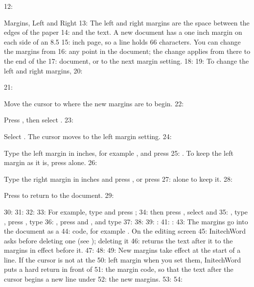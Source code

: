 12: \begin{Feature}{Margins, Left and Right}
13: The left and right margins are the space between the edges of the paper
14: and the text.  A new document has a one inch margin on each side of an 8.5
15: inch page, so a line holds 66 characters.  You can change the margins from
16: any point in the document; the change applies from there to the end of the
17: document, or to the next margin setting.
18: 
19: To change the left and right margins,
20: \begin{WPSteps}
21: \item Move the cursor to where the new margins are to begin.
22: \item Press , then select .
23: \item Select .  The cursor moves to the left margin setting.
24: \item Type the left margin in inches, for example , and press
25: .  To keep the left margin as it is, press  alone.
26: \item Type the right margin in inches and press , or press
27:  alone to keep it.
28: \item Press  to return to the document.
29: \end{WPSteps}
30: 
31: 
32: 
33: For example, type  and press ;
34: then press , select  and
35: , type , press , type
36: , press  and , and type
37: 
38: 
39: : 
41: : 
43: The margins go into the document as a 
44: code, for example \Code{[L/R Mar:1.5",2"]}.  On the editing screen
45: InitechWord asks before deleting one (see ); deleting it
46: returns the text after it to the margins in effect before it.
47: 
48: 
49: New margins take effect at the start of a line.  If the cursor is not at the
50: left margin when you set them, InitechWord puts a hard return in front of
51: the margin code, so that the text after the cursor begins a new line under
52: the new margins.
53: 
54: 

\end{Feature}
